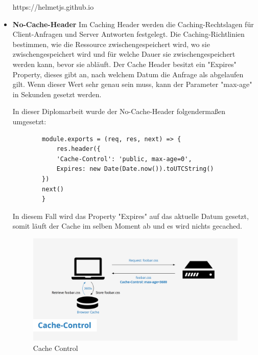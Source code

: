 \begin{itemize}
        \cite{Helmet}
        https://helmetjs.github.io
    \item \textbf{No-Cache-Header}
        \newline
        Im Caching Header werden die Caching-Rechtslagen für Client-Anfragen und Server Antworten festgelegt. Die Caching-Richtlinien bestimmen, wie die Ressource zwischengespeichert wird, wo sie zwischengespeichert wird und für welche Dauer sie zwischengespeichert werden kann, bevor sie abläuft. Der Cache Header besitzt ein "Expires" Property, dieses gibt an, nach welchem Datum die Anfrage als abgelaufen gilt. Wenn dieser Wert sehr genau sein muss, kann der Parameter "max-age" in Sekunden gesetzt werden.

        In dieser Diplomarbeit wurde der No-Cache-Header folgendermaßen umgesetzt:

        \begin{lstlisting}
        module.exports = (req, res, next) => {
            res.header({
            'Cache-Control': 'public, max-age=0',
            Expires: new Date(Date.now()).toUTCString()
        })
        next()
        }
        \end{lstlisting}

        In diesem Fall wird das Property "Expires" auf das aktuelle Datum gesetzt, somit läuft der Cache im selben Moment ab und es wird nichts gecached.

        \begin{figure}[h!]
    \centering
    \includegraphics[width=0.7\linewidth]{pics/cache-control.png}
    \caption{Cache Control}
    \label{fig:enter-label}
\end{figure}


        \cite{No_Cache_Header}
        
\end{itemize}